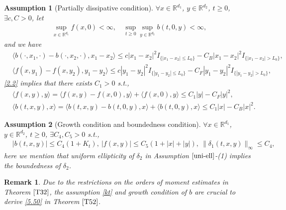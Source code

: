 \documentclass[11pt,reqno]{amsart}
\newtheorem{assumption}{\indent Assumption}[section]
\newtheorem{remark}{\indent Remark}[section]
\numberwithin{equation}{section}
\newcommand{\de}{\delta}
\begin{document}
\begin{assumption}[Partially dissipative condition]\label{par-dis}
 $\forall x\in \mathbb{R}^{d_{1}}$, $y\in \mathbb{R}^{d_{2}}$,  $t\geq0$, $\exists c, C>0$,
let 
\begin{align*}
	\sup_{x\in \mathbb{R}^{d_{1}}}f(x,0)<\infty,  \quad \sup_{t\geq0}\sup_{y\in \mathbb{R}^{d_{2}}}b(t,0,y)<\infty, 
\end{align*}
and we have
\begin{equation}\label{2.2}
	\begin{split}
&\langle b(\cdot,x_{1},\cdot)-b(\cdot,x_{2},\cdot), x_{1}-x_{2}\rangle  \leq c|x_{1}-x_{2}|^{2}I_{\{|x_{1}-x_{2}|\leq L_0\}}-C_B|x_{1}-x_{2}|^{2}I_{\{|x_{1}-x_{2}|>L_0\}},\\
	& \langle f(x,y_{1})-f(x,y_{2}), y_{1}-y_{2}\rangle  \leq c|y_{1}-y_{2}|^{2}I_{\{|y_{1}-y_{2}|\leq L_0\}}-C_F|y_{1}-y_{2}|^{2}I_{\{|y_{1}-y_{2}|>L_0\}},	\end{split}
\end{equation}	
\eqref{2.2} implies that there exists $ C_{1}>0$ s.t.,
\begin{equation}\label{2.4}
	\begin{split}
		&\langle f(x,y),y \rangle=\langle f(x,y)-f(x,0), y \rangle +\langle f(x,0),y\rangle   \leq C_{1}|y|-C_F|y|^{2},\\
			&\langle b(t,x,y),x \rangle =\langle  b(t,x,y)-b(t,0,y), x\rangle  + \langle b(t,0,y),x\rangle  \leq C_{1}|x|-C_B|x|^{2}.
	\end{split}
\end{equation}		
\end{assumption}



\begin{assumption}[Growth condition and boundedness condition]\label{gro-bou}
$\forall x\in \mathbb{R}^{d_{1}}$, $y\in \mathbb{R}^{d_{2}}$, $t\geq0$, $\exists C_{4},C_{5}>0$ s.t.,
\begin{align*}
	&|b(t,x,y)| \leq C_{4}(1+K_{t}),\ |f(x,y)| \leq C_{5}(1+|x|+|y|),\ \|\de_1(t,x,y)\|_{\infty} \leq C_{4},
\end{align*}
here we mention that uniform ellipticity of $\de_{2}$ in Assumption $\ref{uni-ell}$-(1) implies the boundedness of $\de_{2}$.
\end{assumption}
\begin{remark}
Due to the restrictions on the orders of moment estimates in Theorem $\ref{T32}$, the assumption \eqref{kt} and growth condition of $b$ are crucial to derive \eqref{5.50} in Theorem $\ref{T52}$.
\end{remark}
\end{document}
